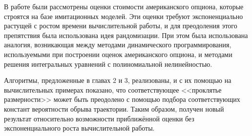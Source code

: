 \conclusion

В работе были рассмотрены оценки стоимости американского опциона, которые строятся на базе имитационных моделей. Эти оценки требуют экспоненциально растущей с ростом времени вычислительной работы, и для преодоления этого препятствия была использована идея рандомизации. При этом была использована аналогия, возникающая между методами динамического программирования, используемыми при построении оценок американского опциона, и методами решения интегральных уравнений с полиномиальной нелинейностью.

Алгоритмы, предложенные в главах 2 и 3, реализованы, и с их помощью на вычислительных примерах показано, что соответствующее <<проклятье размерности>> может быть преодолено с помощью подбора соответствующих констант вероятности обрыва траектории. Таким образом, получен новый результат относительно возможности приближённой оценки без экспоненциального роста вычислительной работы.